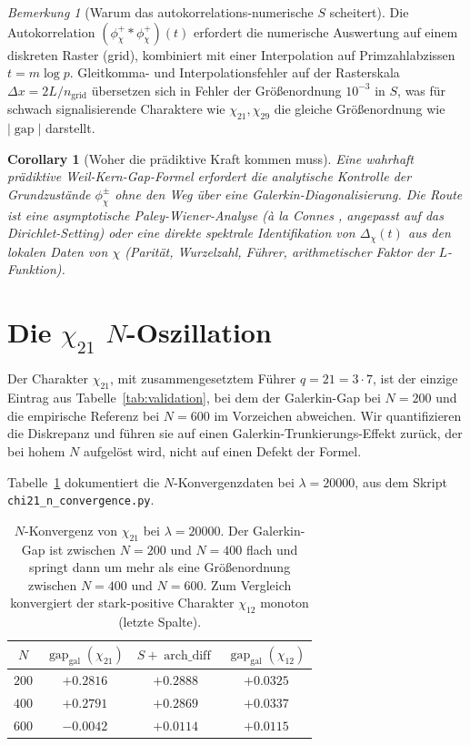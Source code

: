 \documentclass[10pt,twocolumn]{article}
\newtheorem{corollary}[theorem]{Corollary}
\theoremstyle{definition}
\theoremstyle{remark}
\newtheorem{remark}[theorem]{Bemerkung}
\newcommand{\gap}{\operatorname{gap}}
\newcommand{\chifn}{\chi}
\newcommand{\Deltachi}{\Delta_{\chifn}}
\newcommand{\archdiff}{\operatorname{arch\_diff}}
\begin{document}
\begin{remark}[Warum das autokorrelations-numerische $S$ scheitert]
Die Autokorrelation $(\phi_{\chifn}^+\ast\phi_{\chifn}^+)(t)$ erfordert
die numerische Auswertung auf einem diskreten Raster (grid), kombiniert mit einer Interpolation auf
Primzahlabzissen $t=m\log p$. Gleitkomma- und Interpolationsfehler
auf der Rasterskala $\Delta x = 2L/n_{\mathrm{grid}}$ übersetzen sich in Fehler
der Größenordnung $10^{-3}$ in $S$, was für schwach signalisierende
Charaktere wie $\chi_{21},\chi_{29}$ die gleiche Größenordnung wie $|\gap|$ darstellt.
\end{remark}

\begin{corollary}[Woher die prädiktive Kraft kommen muss]
\label{cor:paleywiener}
Eine wahrhaft prädiktive Weil-Kern-Gap-Formel erfordert die analytische Kontrolle
der Grundzustände $\phi^\pm_{\chifn}$ \emph{ohne} den Weg über
eine Galerkin-Diagonalisierung. Die Route ist eine asymptotische Paley-Wiener-Analyse
(\`a la Connes \cite{Connes}, angepasst auf das Dirichlet-Setting) oder eine
direkte spektrale Identifikation von $\Deltachi(t)$ aus den lokalen Daten
von $\chifn$ (Parität, Wurzelzahl, Führer, arithmetischer Faktor der
$L$-Funktion).
\end{corollary}

\section{\texorpdfstring{Die $\chi_{21}$ $N$-Oszillation}{Die chi21 N-Oszillation}}
\label{sec:chi21}

Der Charakter $\chifn_{21}$, mit zusammengesetztem Führer $q=21=3\cdot 7$,
ist der einzige Eintrag aus Tabelle~\ref{tab:validation}, bei dem der Galerkin-Gap
bei $N=200$ und die empirische Referenz bei $N=600$ im Vorzeichen abweichen.
Wir quantifizieren die Diskrepanz und führen sie auf einen
Galerkin-Trunkierungs-Effekt zurück, der bei hohem $N$ aufgelöst wird, nicht auf einen
Defekt der Formel.

Tabelle~\ref{tab:chi21} dokumentiert die $N$-Konvergenzdaten bei
$\lambda=20000$, aus dem Skript \texttt{chi21\_n\_convergence.py}.

\begin{table}[h]
\caption{$N$-Konvergenz von $\chifn_{21}$ bei $\lambda=20000$.
  Der Galerkin-Gap ist zwischen $N=200$ und $N=400$ flach und
  springt dann um mehr als eine Größenordnung zwischen $N=400$ und
  $N=600$. Zum Vergleich konvergiert der stark-positive Charakter
  $\chifn_{12}$ monoton (letzte Spalte).}
\label{tab:chi21}
\centering\small
\begin{tabular}{@{}cccc@{}}
\toprule
$N$ & $\gap_{\mathrm{gal}}(\chifn_{21})$ & $S+\archdiff$ & $\gap_{\mathrm{gal}}(\chifn_{12})$ \\
\midrule
$200$ & $+0.2816$ & $+0.2888$ & $+0.0325$ \\
$400$ & $+0.2791$ & $+0.2869$ & $+0.0337$ \\
$600$ & $-0.0042$ & $+0.0114$ & $+0.0115$ \\
\bottomrule
\end{tabular}
\end{table}
\end{document}
